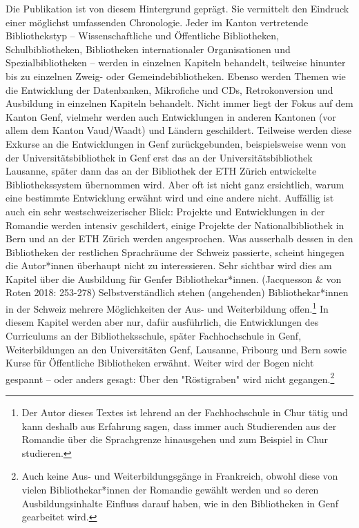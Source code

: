 \documentclass[a4paper,
fontsize=11pt,
oneside,
numbers=noperiodatend,
parskip=half-,
bibliography=totoc,
final
]{scrartcl}
\begin{document}
Die Publikation ist von diesem Hintergrund geprägt. Sie vermittelt den
Eindruck einer möglichst umfassenden Chronologie. Jeder im Kanton
vertretende Bibliothekstyp -- Wissenschaftliche und Öffentliche
Bibliotheken, Schulbibliotheken, Bibliotheken internationaler
Organisationen und Spezialbibliotheken -- werden in einzelnen Kapiteln
behandelt, teilweise hinunter bis zu einzelnen Zweig- oder
Gemeindebibliotheken. Ebenso werden Themen wie die Entwicklung der
Datenbanken, Mikrofiche und CDs, Retrokonversion und Ausbildung in
einzelnen Kapiteln behandelt. Nicht immer liegt der Fokus auf dem Kanton
Genf, vielmehr werden auch Entwicklungen in anderen Kantonen (vor allem
dem Kanton Vaud/Waadt) und Ländern geschildert. Teilweise werden diese
Exkurse an die Entwicklungen in Genf zurückgebunden, beispielsweise wenn
von der Universitätsbibliothek in Genf erst das an der
Universitätsbibliothek Lausanne, später dann das an der Bibliothek der
ETH Zürich entwickelte Bibliothekssystem übernommen wird. Aber oft ist
nicht ganz ersichtlich, warum eine bestimmte Entwicklung erwähnt wird
und eine andere nicht. Auffällig ist auch ein sehr westschweizerischer
Blick: Projekte und Entwicklungen in der Romandie werden intensiv
geschildert, einige Projekte der Nationalbibliothek in Bern und an der
ETH Zürich werden angesprochen. Was ausserhalb dessen in den
Bibliotheken der restlichen Sprachräume der Schweiz passierte, scheint
hingegen die Autor*innen überhaupt nicht zu interessieren. Sehr sichtbar
wird dies am Kapitel über die Ausbildung für Genfer Bibliothekar*innen.
(Jacquesson \& von Roten 2018: 253-278) Selbstverständlich stehen
(angehenden) Bibliothekar*innen in der Schweiz mehrere Möglichkeiten der
Aus- und Weiterbildung offen.\footnote{Der Autor dieses Textes ist
  lehrend an der Fachhochschule in Chur tätig und kann deshalb aus
  Erfahrung sagen, dass immer auch Studierenden aus der Romandie über
  die Sprachgrenze hinausgehen und zum Beispiel in Chur studieren.} In
diesem Kapitel werden aber nur, dafür ausführlich, die Entwicklungen des
Curriculums an der Bibliotheksschule, später Fachhochschule in Genf,
Weiterbildungen an den Universitäten Genf, Lausanne, Fribourg und Bern
sowie Kurse für Öffentliche Bibliotheken erwähnt. Weiter wird der Bogen
nicht gespannt -- oder anders gesagt: Über den "Röstigraben" wird nicht
gegangen.\footnote{Auch keine Aus- und Weiterbildungsgänge in
  Frankreich, obwohl diese von vielen Bibliothekar*innen der Romandie
  gewählt werden und so deren Ausbildungsinhalte Einfluss darauf haben,
  wie in den Bibliotheken in Genf gearbeitet wird.}
\end{document}
